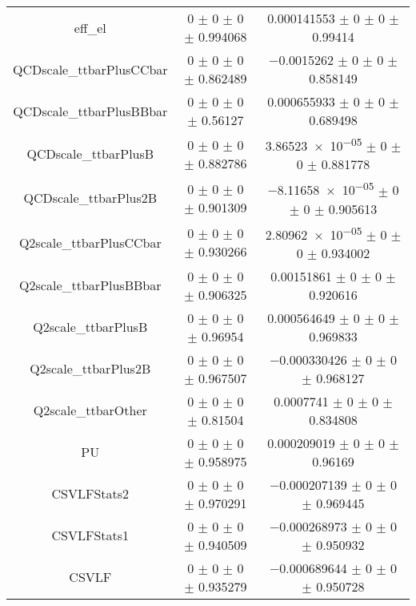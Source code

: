 \begin{table}
\begin{tabular}{ccc}
eff\_el & \num{0} $\pm$ \num{0} $\pm$ \num{0} $\pm$ \num{0.994068} & \num{0.000141553} $\pm$ \num{0} $\pm$ \num{0} $\pm$ \num{0.99414}\\
QCDscale\_ttbarPlusCCbar & \num{0} $\pm$ \num{0} $\pm$ \num{0} $\pm$ \num{0.862489} & \num{-0.0015262} $\pm$ \num{0} $\pm$ \num{0} $\pm$ \num{0.858149}\\
QCDscale\_ttbarPlusBBbar & \num{0} $\pm$ \num{0} $\pm$ \num{0} $\pm$ \num{0.56127} & \num{0.000655933} $\pm$ \num{0} $\pm$ \num{0} $\pm$ \num{0.689498}\\
QCDscale\_ttbarPlusB & \num{0} $\pm$ \num{0} $\pm$ \num{0} $\pm$ \num{0.882786} & \num{3.86523e-05} $\pm$ \num{0} $\pm$ \num{0} $\pm$ \num{0.881778}\\
QCDscale\_ttbarPlus2B & \num{0} $\pm$ \num{0} $\pm$ \num{0} $\pm$ \num{0.901309} & \num{-8.11658e-05} $\pm$ \num{0} $\pm$ \num{0} $\pm$ \num{0.905613}\\
Q2scale\_ttbarPlusCCbar & \num{0} $\pm$ \num{0} $\pm$ \num{0} $\pm$ \num{0.930266} & \num{2.80962e-05} $\pm$ \num{0} $\pm$ \num{0} $\pm$ \num{0.934002}\\
Q2scale\_ttbarPlusBBbar & \num{0} $\pm$ \num{0} $\pm$ \num{0} $\pm$ \num{0.906325} & \num{0.00151861} $\pm$ \num{0} $\pm$ \num{0} $\pm$ \num{0.920616}\\
Q2scale\_ttbarPlusB & \num{0} $\pm$ \num{0} $\pm$ \num{0} $\pm$ \num{0.96954} & \num{0.000564649} $\pm$ \num{0} $\pm$ \num{0} $\pm$ \num{0.969833}\\
Q2scale\_ttbarPlus2B & \num{0} $\pm$ \num{0} $\pm$ \num{0} $\pm$ \num{0.967507} & \num{-0.000330426} $\pm$ \num{0} $\pm$ \num{0} $\pm$ \num{0.968127}\\
Q2scale\_ttbarOther & \num{0} $\pm$ \num{0} $\pm$ \num{0} $\pm$ \num{0.81504} & \num{0.0007741} $\pm$ \num{0} $\pm$ \num{0} $\pm$ \num{0.834808}\\
PU & \num{0} $\pm$ \num{0} $\pm$ \num{0} $\pm$ \num{0.958975} & \num{0.000209019} $\pm$ \num{0} $\pm$ \num{0} $\pm$ \num{0.96169}\\
CSVLFStats2 & \num{0} $\pm$ \num{0} $\pm$ \num{0} $\pm$ \num{0.970291} & \num{-0.000207139} $\pm$ \num{0} $\pm$ \num{0} $\pm$ \num{0.969445}\\
CSVLFStats1 & \num{0} $\pm$ \num{0} $\pm$ \num{0} $\pm$ \num{0.940509} & \num{-0.000268973} $\pm$ \num{0} $\pm$ \num{0} $\pm$ \num{0.950932}\\
CSVLF & \num{0} $\pm$ \num{0} $\pm$ \num{0} $\pm$ \num{0.935279} & \num{-0.000689644} $\pm$ \num{0} $\pm$ \num{0} $\pm$ \num{0.950728}\\

\end{tabular}
\end{table}
